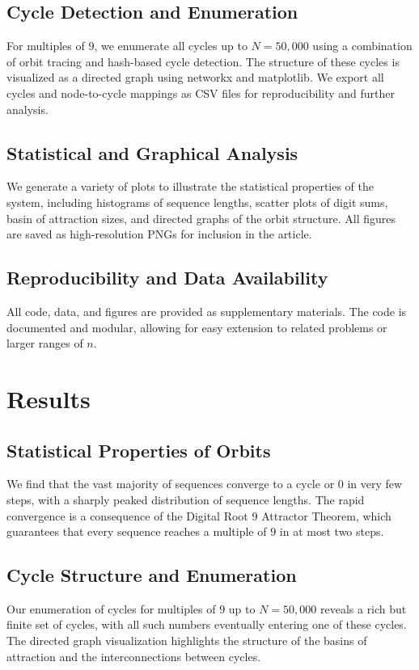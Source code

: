 \documentclass[12pt]{article}
\begin{document}
\subsection{Cycle Detection and Enumeration}
For multiples of $9$, we enumerate all cycles up to $N=50,000$ using a combination of orbit tracing and hash-based cycle detection. The structure of these cycles is visualized as a directed graph using networkx and matplotlib. We export all cycles and node-to-cycle mappings as CSV files for reproducibility and further analysis.

\subsection{Statistical and Graphical Analysis}
We generate a variety of plots to illustrate the statistical properties of the system, including histograms of sequence lengths, scatter plots of digit sums, basin of attraction sizes, and directed graphs of the orbit structure. All figures are saved as high-resolution PNGs for inclusion in the article.

\subsection{Reproducibility and Data Availability}
All code, data, and figures are provided as supplementary materials. The code is documented and modular, allowing for easy extension to related problems or larger ranges of $n$.

\section{Results}
\subsection{Statistical Properties of Orbits}
We find that the vast majority of sequences converge to a cycle or $0$ in very few steps, with a sharply peaked distribution of sequence lengths. The rapid convergence is a consequence of the Digital Root 9 Attractor Theorem, which guarantees that every sequence reaches a multiple of $9$ in at most two steps.

\subsection{Cycle Structure and Enumeration}
Our enumeration of cycles for multiples of $9$ up to $N=50,000$ reveals a rich but finite set of cycles, with all such numbers eventually entering one of these cycles. The directed graph visualization highlights the structure of the basins of attraction and the interconnections between cycles.
\end{document}
